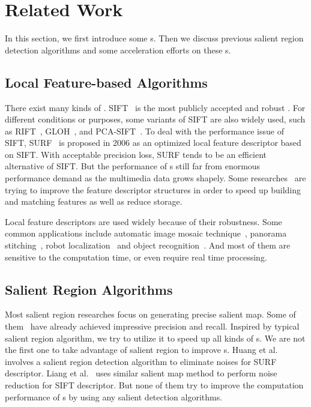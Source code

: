 \section{Related Work}

In this section, we first introduce some {\lfea}s. Then we discuss previous salient region detection algorithms and some acceleration efforts on these {\lfea}s.

\subsection{Local Feature-based Algorithms}

There exist many kinds of {\lfea}. SIFT~\cite{lowe1999object, lowe2004distinctive} is the most publicly accepted and robust {\lfea}. For different conditions or purposes, some variants of SIFT are also widely used, such as RIFT~\cite{lazebnik2005sparse}, GLOH~\cite{mikolajczyk2005performance}, and PCA-SIFT~\cite{ke2004pca}. To deal with the performance issue of SIFT, SURF~\cite{bay2006surf} is proposed in 2006 as an optimized local feature descriptor based on SIFT. With acceptable precision loss, SURF tends to be an efficient alternative of SIFT. But the performance of {\lfea}s still far from enormous performance demand as the multimedia data grows shapely. Some researches~\cite{calonder2010brief}\cite{alhwarin2010vf} are trying to improve the feature descriptor structures in order to speed up building and matching features as well as reduce storage.

Local feature descriptors are used widely because of their robustness. Some common applications include automatic image mosaic technique~\cite{yang2008image, salgian2007using}, panorama stitching~\cite{brown2003recognising,tang2008modified}, robot localization~\cite{se2001vision} and object recognition~\cite{heo2008illumination}. And most of them are sensitive to the computation time, or even require real time processing.

\subsection{Salient Region Algorithms}

Most salient region researches focus on generating precise salient map. Some of them~\cite{cheng2011global,achanta2009frequency} have already achieved impressive precision and recall. Inspired by typical salient region algorithm, we try to utilize it to speed up all kinds of {\lfea}s. We are not the first one to take advantage of salient region to improve {\lfea}s. Huang et al.~\cite{huang2009image} involves a salient region detection algorithm to eliminate noises for SURF descriptor. Liang et al.~\cite{liang2010salient} uses similar salient map method to perform noise reduction for SIFT descriptor. But none of them try to improve the computation performance of {\lfea}s by using any salient detection algorithms.

